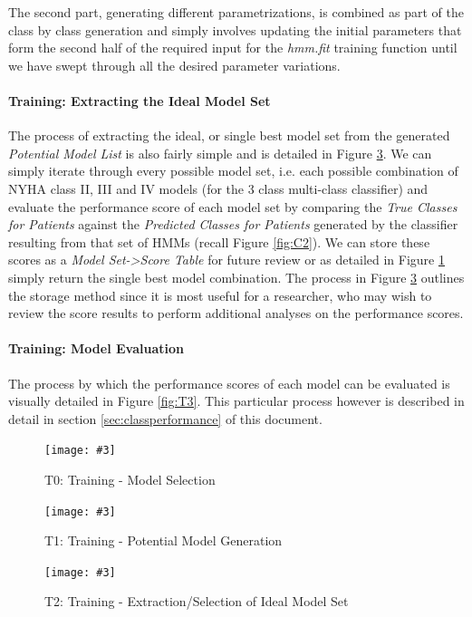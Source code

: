 \documentclass[]{article}
\newcommand\landscapeFigure[4]{
	\newgeometry{left=#1,right=#1,top=#1}
	\begin{landscape}
		\begin{figure}
			\centering
			\texttt{[image: \#3]}
			\caption{#2}
			\label{#4}
		\end{figure}
	\end{landscape}
	\restoregeometry
}
\begin{document}
The second part, generating different parametrizations, is combined as part of the class by class generation and simply involves updating the initial parameters that form the second half of the required input for the \textit{hmm.fit} training function until we have swept through all the desired parameter variations.

\paragraph{Training: Extracting the Ideal Model Set}

The process of extracting the ideal, or single best model set from the generated \textit{Potential Model List} is also fairly simple and is detailed in Figure \ref{fig:T2}. We can simply iterate through every possible model set, i.e. each possible combination of NYHA class II, III and IV models (for the 3 class multi-class classifier) and evaluate the performance score of each model set by comparing the \textit{True Classes for Patients} against the \textit{Predicted Classes for Patients} generated by the classifier resulting from that set of HMMs (recall Figure \ref{fig:C2}). We can store these scores as a \textit{Model Set-\textgreater Score Table} for future review or as detailed in Figure \ref{fig:T0} simply return the single best model combination. The process in Figure \ref{fig:T2} outlines the storage method since it is most useful for a researcher, who may wish to review the score results to perform additional analyses on the performance scores.

\paragraph{Training: Model Evaluation}

The process by which the performance scores of each model can be evaluated is visually detailed in Figure \ref{fig:T3}. This particular process however is described in detail in section \ref{sec:classperformance} of this document.

\landscapeFigure{1cm}{T0: Training - Model Selection}{../modelDevelopmentFlowcharts/T0-Training_Model_Selection.png}{fig:T0}

\landscapeFigure{1cm}{T1: Training - Potential Model Generation}{../modelDevelopmentFlowcharts/T1-Training_Potential_Model_Generation.png}{fig:T1}

\landscapeFigure{1cm}{T2: Training - Extraction/Selection of Ideal Model Set}{../modelDevelopmentFlowcharts/T2-Training_Extract_Ideal_Model_Set.png}{fig:T2}
\end{document}
